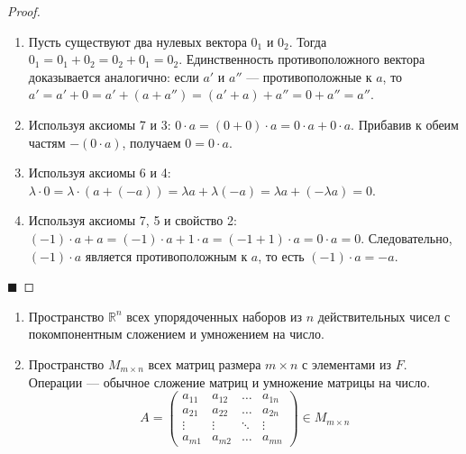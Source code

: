 \begin{proof}
\begin{enumerate}
    \item Пусть существуют два нулевых вектора $0_1$ и $0_2$. Тогда $0_1 = 0_1 + 0_2 = 0_2 + 0_1 = 0_2$. Единственность противоположного вектора доказывается аналогично: если $a'$ и $a''$ --- противоположные к $a$, то $a' = a' + 0 = a' + (a + a'') = (a' + a) + a'' = 0 + a'' = a''$.
    \item Используя аксиомы 7 и 3: $0 \cdot a = (0 + 0) \cdot a = 0 \cdot a + 0 \cdot a$. Прибавив к обеим частям $-(0 \cdot a)$, получаем $0 = 0 \cdot a$.
    \item Используя аксиомы 6 и 4: $\lambda \cdot 0 = \lambda \cdot (a + (-a)) = \lambda a + \lambda(-a) = \lambda a + (-\lambda a) = 0$.
    \item Используя аксиомы 7, 5 и свойство 2: $(-1) \cdot a + a = (-1) \cdot a + 1 \cdot a = (-1 + 1) \cdot a = 0 \cdot a = 0$. Следовательно, $(-1) \cdot a$ является противоположным к $a$, то есть $(-1) \cdot a = -a$.
\end{enumerate}
\hfill$\blacksquare$
\end{proof}

\begin{example}
\begin{enumerate}
    \item Пространство $\mathbb{R}^n$ всех упорядоченных наборов из $n$ действительных чисел с покомпонентным сложением и умножением на число.
    \item Пространство $M_{m \times n}$ всех матриц размера $m \times n$ с элементами из $F$. Операции --- обычное сложение матриц и умножение матрицы на число.
    \[
    A = \begin{pmatrix}
    a_{11} & a_{12} & \dots & a_{1n} \\
    a_{21} & a_{22} & \dots & a_{2n} \\
    \vdots & \vdots & \ddots & \vdots \\
    a_{m1} & a_{m2} & \dots & a_{mn}
    \end{pmatrix} \in M_{m \times n}
    \]
\end{enumerate}
\end{example}
